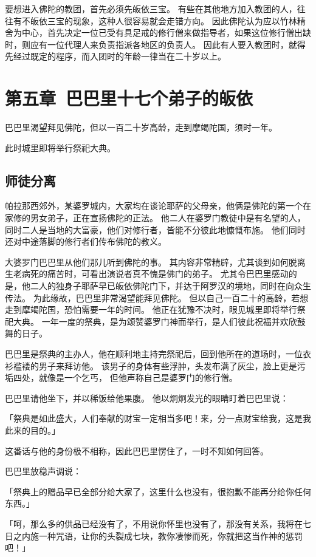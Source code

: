 \documentclass[twoside,openany]{book}
\begin{document}
要想进入佛陀的教团，首先必须先皈依三宝。
有些在其他地方加入教团的人，往往有不皈依三宝的现象，这种人很容易就会走错方向。
因此佛陀认为应以竹林精舍为中心，首先决定一位已受有具足戒的修行僧来做指导者，如果这位修行僧出缺时，则应有一位代理人来负责指派各地区的负责人。
因此有人要入教团时，就得先经过既定的程序，而入团时的年龄一律当在二十岁以上。

\chapter{第五章\ 巴巴里十七个弟子的皈依}\label{ch5}
巴巴里渴望拜见佛陀，但以一百二十岁高龄，走到摩竭陀国，须时一年。

此时城里即将举行祭祀大典。
\newpage
\section{师徒分离}\label{sec5.1}

帕拉那西郊外，某婆罗城内，大家均在谈论耶萨的父母亲，他俩是佛陀的第一个在家修的男女弟子，正在宣扬佛陀的正法。
他二人在婆罗门教徒中是有名望的人，同时二人是当地的大富豪，他们对修行者，皆能不分彼此地慷慨布施。
他们同时还对中途落脚的修行者们传布佛陀的教义。

大婆罗门巴巴里从他们那儿听到佛陀的事。
其内容非常精辟，尤其谈到如何脱离生老病死的痛苦时，可看出演说者真不愧是佛门的弟子。
尤其令巴巴里感动的是，他二人的独身子耶萨早已皈依佛陀门下，并达于阿罗汉的境地，同时在向众生传法。
为此缘故，巴巴里非常渴望能拜见佛陀。
但以自己一百二十的高龄，若想走到摩竭陀国，恐怕需要一年的时间。
他正在犹豫不决时，眼见城里即将举行祭祀大典。
一年一度的祭典，是为颂赞婆罗门神而举行，是人们彼此祝福并欢欣鼓舞的日子。

巴巴里是祭典的主办人，他在顺利地主持完祭祀后，回到他所在的道场时，一位衣衫褴褛的男子来拜访他。
该男子的身体有些浮肿，头发布满了灰尘，脸上更是污垢四处，就像是一个乞丐，
但他声称自己是婆罗门的修行僧。

巴巴里请他坐下，并以稀饭给他果腹。
他以炯炯发光的眼睛盯着巴巴里说：

「祭典是如此盛大，人们奉献的财宝一定相当多吧！来，分一点财宝给我，这是我此来的目的。」

这番话与他的身份极不相称，因此巴巴里愣住了，一时不知如何回答。

巴巴里放稳声调说：

「祭典上的赠品早已全部分给大家了，这里什么也没有，很抱歉不能再分给你任何东西。」

「呵，那么多的供品已经没有了，不用说你怀里也没有了，那没有关系，我将在七日之内施一种咒语，让你的头裂成七块，教你凄惨而死，你就把这当作神的惩罚吧！」
\end{document}
